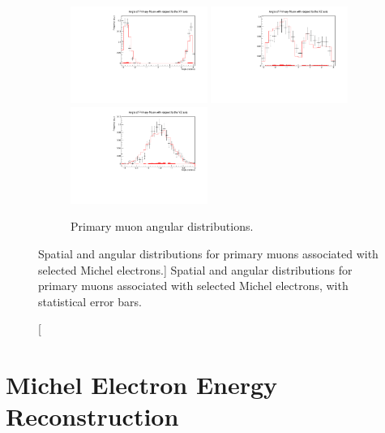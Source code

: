 \begin{figure}
	\begin{subfigure}[b]{\textwidth}
		\centering
		\vspace{1cm}
		\includegraphics[width=0.49\textwidth]{figures/DataVMC_angle_xy.pdf}
		\hfill
		\includegraphics[width=0.49\textwidth]{figures/DataVMC_angle_xz.pdf}
		\includegraphics[width=0.49\textwidth]{figures/DataVMC_angle_yz.pdf}
		\caption {Primary muon angular distributions.}
		\label{fig:muon_angles}
	\end{subfigure}


	\caption
	[Spatial and angular distributions for primary muons associated with selected
	Michel electrons.]
	{Spatial and angular distributions for primary muons associated with selected
	Michel electrons, with statistical error bars.}

	\label{fig:muon_distributions}

\end{figure}

\section{Michel Electron Energy Reconstruction} \label{ME_R}

